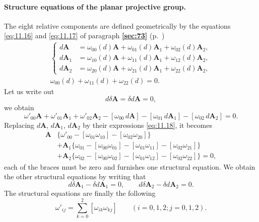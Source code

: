 \documentclass[leqno,11pt]{book}
\numberwithin{equation}{chapter}
\theoremstyle{shape1}
\theoremstyle{shapesmall}
\newcommand{\fsref}[1]{{\rm\textsection\textbf{\ref{sec:#1}}}}
\begin{document}
\paragraph{Structure equations of the planar projective group.}
\label{sec:159}
The eight relative components are defined geometrically by the equations \eqref{eq:11.16} and \eqref{eq:11.17} of paragraph \fsref{73} (p.~\pageref{sec:73})
\begin{gather}
  \label{eq:11.18}
  \left\{
    \begin{aligned}
      d\mathbf{A}_{\phantom{0}}&=\omega_{00}(d)\mathbf{A}+\omega_{01}(d)\mathbf{A}_{1}+\omega_{02}(d)\mathbf{A}_{2},\\
      d\mathbf{A}_{{1}}&=\omega_{10}(d)\mathbf{A}+\omega_{11}(d)\mathbf{A}_{1}+\omega_{12}(d)\mathbf{A}_{2},\\
      d\mathbf{A}_{{2}}&=\omega_{20}(d)\mathbf{A}+\omega_{21}(d)\mathbf{A}_{1}+\omega_{22}(d)\mathbf{A}_{2},
    \end{aligned}
  \right.\\
  \label{eq:11.19}
  \omega_{00}(d)+\omega_{11}(d)+\omega_{22}(d)=0.
\end{gather}
Let us write out
\[
d\delta\mathbf{A}=\delta d\mathbf{A}=0,
\]
we obtain
\[
\omega'_{00}\mathbf{A}+\omega'_{01}\mathbf{A}_{1}+\omega'_{02}\mathbf{A}_{2}-[\omega_{00}\,d\mathbf{A}]-[\omega_{01}\,d\mathbf{A}_{1}]-[\omega_{02}\,d\mathbf{A}_{2}]=0.
\]
Replacing $d\mathbf{A}$, $d\mathbf{A}_{1}$, $d\mathbf{A}_{2}$ by their expressions \eqref{eq:11.18}, it becomes
\begin{align*}
  \mathbf{A}{}&{}\{{}\omega'_{00}-[\omega_{01}\omega_{10}]-[\omega_{02}\omega_{20}]\}\\
  &+\mathbf{A}_{1}\{\omega_{01}-[\omega_{00}\omega_{01}]-[\omega_{01}\omega_{11}]-[\omega_{02}\omega_{21}]\}\\
  &+\mathbf{A}_{2}\{\omega_{02}-[\omega_{00}\omega_{02}]-[\omega_{01}\omega_{12}]-[\omega_{02}\omega_{22}]\}=0,
\end{align*}
each of the braces must be zero and furnishes one structural equation. We obtain the other structural equations by writing that
\[
d\delta\mathbf{A}_{1}-\delta d\mathbf{A}_{1}=0,\qquad
d\delta\mathbf{A}_{2}-\delta d\mathbf{A}_{2}=0.
\]
The structural equations are finally the following
\begin{equation}
  \label{eq:11.20}
  \omega'_{ij}=\sum_{k=0}^{2}[\omega_{ik}\omega_{kj}]\qquad(i=0,1,2;j=0,1,2).
\end{equation}
\end{document}
